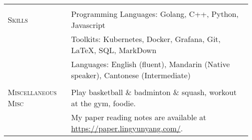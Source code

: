 \documentclass[letterpaper, 12pt]{article}
\begin{document}
\begin{longtable}{p{1.0in}p{5.8in}}

& \\

\nohyphens{\textsc{Skills}}
& Programming Languages: Golang, C++, Python, Javascript \\
& Toolkits: Kubernetes, Docker, Grafana, Git, \LaTeX, SQL, MarkDown \\
& Languages: English (fluent), Mandarin (Native speaker), Cantonese (Intermediate) \\
& \\


\nohyphens{\textsc{Miscellaneous}}
\nohyphens{\textsc{Misc}}
& Play basketball \& badminton \& squash, workout at the gym, foodie. \\
& My paper reading notes are available at \href{https://paper.lingyunyang.com/}{https://paper.lingyunyang.com/}. \\


\end{longtable}
\end{document}

